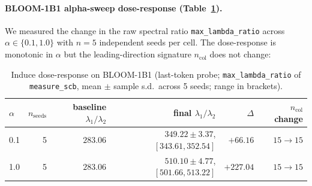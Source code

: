 \documentclass[11pt,a4paper]{article}
\begin{document}
\paragraph{BLOOM-1B1 alpha-sweep dose-response (Table~\ref{tab:induce}).}
We measured the change in the raw spectral ratio
\texttt{max\_lambda\_ratio} across $\alpha \in \{0.1, 1.0\}$ with
$n=5$ independent seeds per cell. The dose-response is monotonic
in $\alpha$ but the leading-direction signature
$n_\mathrm{col}$ does not change:

\begin{table}[h]
\centering
\caption{Induce dose-response on BLOOM-1B1 (last-token probe;
\texttt{max\_lambda\_ratio} of \texttt{measure\_scb}, mean $\pm$
sample s.d.\ across 5 seeds; range in brackets).}
\label{tab:induce}
\begin{tabular}{lrrrrr}
\toprule
$\alpha$ & $n_\mathrm{seeds}$ & baseline $\lambda_1/\lambda_2$
         & final $\lambda_1/\lambda_2$ & $\Delta$ & $n_\mathrm{col}$ change \\
\midrule
0.1 & 5 & $283.06$ & $349.22 \pm 3.37$, $[343.61, 352.54]$ &  $+66.16$  & $15 \to 15$ \\
1.0 & 5 & $283.06$ & $510.10 \pm 4.77$, $[501.66, 513.22]$ & $+227.04$  & $15 \to 15$ \\
\bottomrule
\end{tabular}
\end{table}
\end{document}
